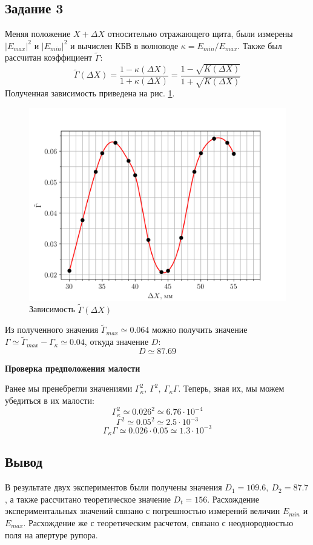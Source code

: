 \subsection{Задание 3}
Меняя положение $X +\Delta X$ относительно отражающего щита, были измерены $|E_{max}|^2$ и $|E_{min}|^2$ и вычислен
КБВ в волноводе $\kappa = E_{min} / E_{max}$. Также был рассчитан коэффициент $\tilde{\Gamma} $:
\begin{equation}
    \tilde{\Gamma}(\Delta X)= \frac{1-\kappa (\Delta X)}{1+\kappa (\Delta X)} = \frac{1-\sqrt{K(\Delta X)}}{1+\sqrt{K(\Delta X)}} 
\end{equation}
Полученная зависимость приведена на рис. \ref{fig:exp:3}.
\begin{figure}[h!]
    \centering
    \includegraphics[width = 0.9\linewidth]{graphs/data33.png}
    \caption{Зависимость $\tilde{\Gamma}(\Delta X)$ }
    \label{fig:exp:3}
\end{figure}

Из полученного значения $\tilde{\Gamma}_{max} \simeq 0.064$ можно получить значение $\Gamma \simeq \tilde{\Gamma}_{max} -
\Gamma_{\kappa} \simeq 0.04$, откуда значение $D$: $$D \simeq 87.69$$ 

\textbf{Проверка предположения малости}

Ранее мы пренебрегли значениями $ \Gamma_{\kappa}^2,~ \Gamma^2,~ \Gamma_{\kappa} \Gamma $. Теперь, зная их, мы
можем убедиться в их малости: 
$$ \Gamma_{\kappa}^2 \simeq 0.026^2 \simeq 6.76 \cdot 10^{-4} $$
$$\Gamma^2 \simeq 0.05^2 \simeq 2.5 \cdot 10^{-3} $$
$$\Gamma_{\kappa} \Gamma \simeq 0.026 \cdot 0.05 \simeq 1.3 \cdot 10^{-3}$$


\subsection{Вывод}
В результате двух экспериментов были получены значения $D_1 = 109.6,~ D_2 = 87.7$, а также рассчитано теоретическое
значение $D_t = 156$. Расхождение экспериментальных значений связано с погрешностью измерений величин $E_{min}$ и
$E_{max}$. Расхождение же с теоретическим расчетом, связано с неоднородностью поля на апертуре рупора.
 

